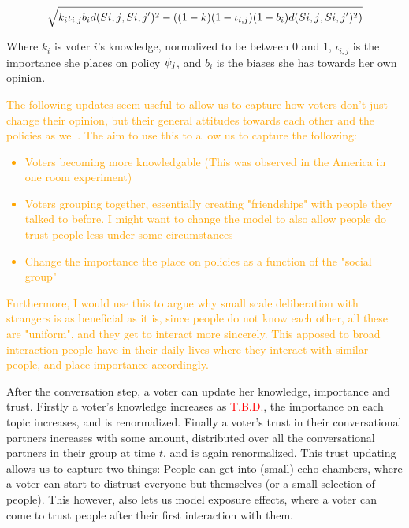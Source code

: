 \begin{equation} \label{eq:abm_update_function} \sqrt{k_{i}\iota_{i,j}
b_{i}d(S{i,j}, S{i,j}')^{2} -
((1-k)(1-\iota_{i,j})(1-b_{i})d(S{i,j}, S{i,j}')^{2})}
\end{equation}

Where $k_{i}$ is voter $i$'s knowledge, normalized to be between 0 and 1,
$\iota_{i,j}$ is the importance she places on policy $\psi_{j}$, and $b_{i}$
is the biases she has towards her own opinion.

\textcolor{orange}{The following updates seem useful to allow us to capture how
voters don't just change their opinion, but their general attitudes towards
each other and the policies as well. The aim to use this to allow us to capture
the following:} \textcolor{orange}{ \begin{itemize} \item Voters becoming more
		knowledgable (This was observed in the America in one room
		experiment) \item Voters grouping together, essentially
		creating "friendships" with people they talked to before. I
		might want to change the model to also allow people do trust
		people less under some circumstances \item Change the
importance the place on policies as a function of the "social group"
\end{itemize}}

\textcolor{orange}{ Furthermore, I would use this to argue why small scale
	deliberation with strangers is as beneficial as it is, since people do
	not know each other, all these are "uniform", and they get to interact
	more sincerely. This apposed to broad interaction people have in their
	daily lives where they interact with similar people, and place
	importance accordingly. }

	After the conversation step, a voter can update her knowledge,
	importance and trust. Firstly a voter's knowledge increases as
	\textcolor{red}{T.B.D.}, the importance on each topic increases, and is
	renormalized. Finally a voter's trust in their conversational partners
	increases with some amount, distributed over all the conversational
	partners in their group at time $t$, and is again renormalized. This
	trust updating allows us to capture two things: People can get into
	(small) echo chambers, where a voter can start to distrust everyone but
	themselves (or a small selection of people). This however, also lets us
	model exposure effects, where a voter can come to trust people after
	their first interaction with them.


